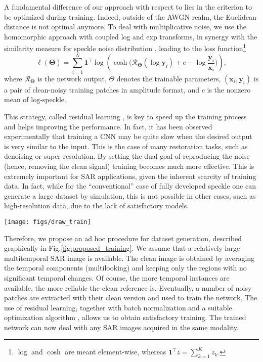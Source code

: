 \documentclass{article}
\begin{document}
A fundamental difference of our approach with respect to \cite{Zhang2016} lies in the criterion to be optimized during training. Indeed, outside of the AWGN realm, the Euclidean distance is not optimal anymore. To deal with multiplicative noise, we use the homomorphic approach with coupled log and exp transforms, in synergy with the similarity measure for speckle noise distribution \cite{Deledalle2012}, leading to the loss function\footnote{$\log$ and $\cosh$ are meant element-wise, whereas $\mathbf{1}^\top z = \sum_{k=1}^K z_k$.}
\begin{equation}
\ell(\mathbf{\Theta}) = \sum_{i=1}^N \mathbf{1}^\top\log\left( \cosh\Big( \mathcal{R}_{\mathbf{\Theta}}(\log \mathbf{y}_i) +c - \log \frac{\mathbf{y}_i}{\mathbf{x}_i} \Big) \right),
\end{equation}
where $\mathcal{R}_{\mathbf{\Theta}}$ is the network output, $\Theta$ denotes the trainable parameters, $(\mathbf{x}_i,\mathbf{y}_i)$ is a pair of clean-noisy training patches in amplitude format, and $c$ is the nonzero mean of log-speckle.

This strategy, called residual learning \cite{He2016}, is key to speed up the training process and helps improving the performance.
In fact, it has been observed experimentally \cite{He2016} that training a CNN may be quite slow when the desired output is very similar to the input.
This is the case of many restoration tasks, such as denoising or super-resolution.
By setting the dual goal of reproducing the noise (hence, removing the clean signal)
training becomes much more effective.
This is extremely important for SAR applications, given the inherent scarcity of training data.
In fact, while for the ``conventional'' case of fully developed speckle one can generate a large dataset by simulation,
this is not possible in other cases, such as high-resolution data, due to the lack of satisfactory models.

\begin{figure*}[!t]
	\centerline{\texttt{[image: figs/draw\_train]}}
	\caption{Training procedure.}
	\label{fig:proposed_training}
\end{figure*}

Therefore, we propose an ad hoc procedure for dataset generation, described graphically in Fig.\ref{fig:proposed_training}.
We assume that a relatively large multitemporal SAR image is available.
The clean image is obtained by averaging the temporal components (multilooking) and keeping only the regions with no significant temporal changes.
Of course, the more temporal instances are available, the more reliable the clean reference is.
Eventually, a number of noisy patches are extracted with their clean version and used to train the network.
The use of residual learning, together with batch normalization and a suitable optimization algorithm \cite{Kingma2015}, allows us to obtain satisfactory training.
The trained network can now deal with any SAR images acquired in the same modality.
\end{document}
